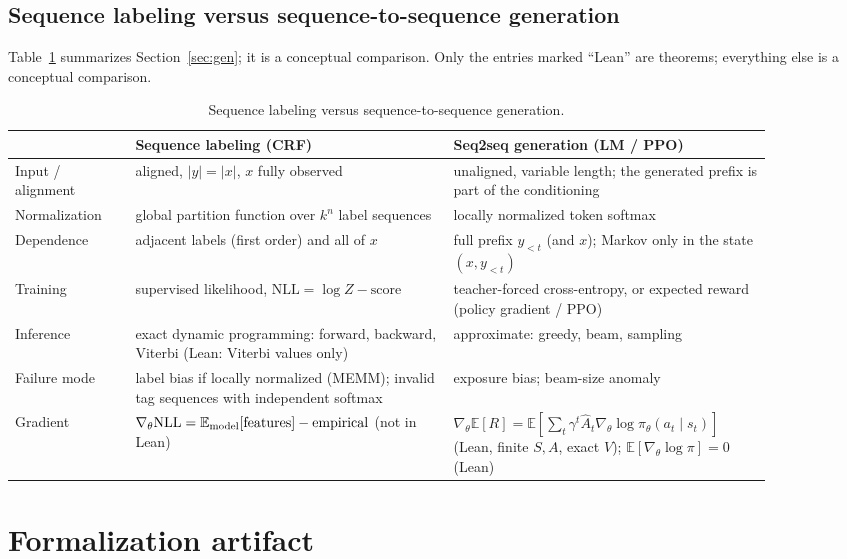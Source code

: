\documentclass[11pt,a4paper]{article}
\newcommand{\E}{\mathbb{E}}
\newcommand{\grad}{\nabla_{\theta}}
\begin{document}
\subsection{Sequence labeling versus sequence-to-sequence generation}
Table~\ref{tab:labgen} summarizes Section~\ref{sec:gen}; it is a conceptual comparison.
Only the entries marked ``Lean'' are theorems; everything else is a conceptual comparison.

\begin{table}[ht]
\centering
\footnotesize
\renewcommand{\arraystretch}{1.15}
\begin{tabular}{@{}>{\raggedright\arraybackslash}p{0.14\linewidth}>{\raggedright\arraybackslash}p{0.37\linewidth}>{\raggedright\arraybackslash}p{0.37\linewidth}@{}}
\toprule
 & Sequence labeling (CRF) & Seq2seq generation (LM / PPO) \\
\midrule
Input / alignment & aligned, $|y|=|x|$, $x$ fully observed & unaligned, variable length; the generated prefix is part of the conditioning \\
Normalization & global partition function over $k^n$ label sequences & locally normalized token softmax \\
Dependence & adjacent labels (first order) and all of $x$ & full prefix $y_{<t}$ (and $x$); Markov only in the state $(x,y_{<t})$ \\
Training & supervised likelihood, $\text{NLL}=\log Z-\text{score}$ & teacher-forced cross-entropy, or expected reward (policy gradient / PPO) \\
Inference & exact dynamic programming: forward, backward, Viterbi (Lean: Viterbi values only) & approximate: greedy, beam, sampling \\
Failure mode & label bias if locally normalized (MEMM); invalid tag sequences with independent softmax & exposure bias; beam-size anomaly \\
Gradient & $\grad\text{NLL}=\E_{\rm model}[\text{features}]-\text{empirical}$ (not in Lean) & $\grad\E[R]=\E[\sum_t\gamma^t\hat A_t\grad\log\pi_\theta(a_t\mid s_t)]$ (Lean, finite $S,A$, exact $V$); $\E[\grad\log\pi]=0$ (Lean) \\
\bottomrule
\end{tabular}
\caption{Sequence labeling versus sequence-to-sequence generation.}
\label{tab:labgen}
\end{table}

\section{Formalization artifact}
\label{sec:artifact}
\end{document}
